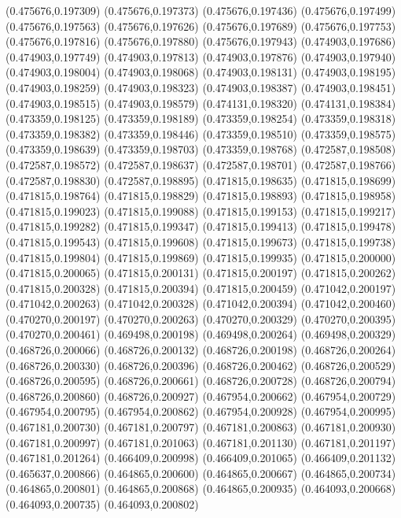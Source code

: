 (0.475676,0.197309)
(0.475676,0.197373)
(0.475676,0.197436)
(0.475676,0.197499)
(0.475676,0.197563)
(0.475676,0.197626)
(0.475676,0.197689)
(0.475676,0.197753)
(0.475676,0.197816)
(0.475676,0.197880)
(0.475676,0.197943)
(0.474903,0.197686)
(0.474903,0.197749)
(0.474903,0.197813)
(0.474903,0.197876)
(0.474903,0.197940)
(0.474903,0.198004)
(0.474903,0.198068)
(0.474903,0.198131)
(0.474903,0.198195)
(0.474903,0.198259)
(0.474903,0.198323)
(0.474903,0.198387)
(0.474903,0.198451)
(0.474903,0.198515)
(0.474903,0.198579)
(0.474131,0.198320)
(0.474131,0.198384)
(0.473359,0.198125)
(0.473359,0.198189)
(0.473359,0.198254)
(0.473359,0.198318)
(0.473359,0.198382)
(0.473359,0.198446)
(0.473359,0.198510)
(0.473359,0.198575)
(0.473359,0.198639)
(0.473359,0.198703)
(0.473359,0.198768)
(0.472587,0.198508)
(0.472587,0.198572)
(0.472587,0.198637)
(0.472587,0.198701)
(0.472587,0.198766)
(0.472587,0.198830)
(0.472587,0.198895)
(0.471815,0.198635)
(0.471815,0.198699)
(0.471815,0.198764)
(0.471815,0.198829)
(0.471815,0.198893)
(0.471815,0.198958)
(0.471815,0.199023)
(0.471815,0.199088)
(0.471815,0.199153)
(0.471815,0.199217)
(0.471815,0.199282)
(0.471815,0.199347)
(0.471815,0.199413)
(0.471815,0.199478)
(0.471815,0.199543)
(0.471815,0.199608)
(0.471815,0.199673)
(0.471815,0.199738)
(0.471815,0.199804)
(0.471815,0.199869)
(0.471815,0.199935)
(0.471815,0.200000)
(0.471815,0.200065)
(0.471815,0.200131)
(0.471815,0.200197)
(0.471815,0.200262)
(0.471815,0.200328)
(0.471815,0.200394)
(0.471815,0.200459)
(0.471042,0.200197)
(0.471042,0.200263)
(0.471042,0.200328)
(0.471042,0.200394)
(0.471042,0.200460)
(0.470270,0.200197)
(0.470270,0.200263)
(0.470270,0.200329)
(0.470270,0.200395)
(0.470270,0.200461)
(0.469498,0.200198)
(0.469498,0.200264)
(0.469498,0.200329)
(0.468726,0.200066)
(0.468726,0.200132)
(0.468726,0.200198)
(0.468726,0.200264)
(0.468726,0.200330)
(0.468726,0.200396)
(0.468726,0.200462)
(0.468726,0.200529)
(0.468726,0.200595)
(0.468726,0.200661)
(0.468726,0.200728)
(0.468726,0.200794)
(0.468726,0.200860)
(0.468726,0.200927)
(0.467954,0.200662)
(0.467954,0.200729)
(0.467954,0.200795)
(0.467954,0.200862)
(0.467954,0.200928)
(0.467954,0.200995)
(0.467181,0.200730)
(0.467181,0.200797)
(0.467181,0.200863)
(0.467181,0.200930)
(0.467181,0.200997)
(0.467181,0.201063)
(0.467181,0.201130)
(0.467181,0.201197)
(0.467181,0.201264)
(0.466409,0.200998)
(0.466409,0.201065)
(0.466409,0.201132)
(0.465637,0.200866)
(0.464865,0.200600)
(0.464865,0.200667)
(0.464865,0.200734)
(0.464865,0.200801)
(0.464865,0.200868)
(0.464865,0.200935)
(0.464093,0.200668)
(0.464093,0.200735)
(0.464093,0.200802)
